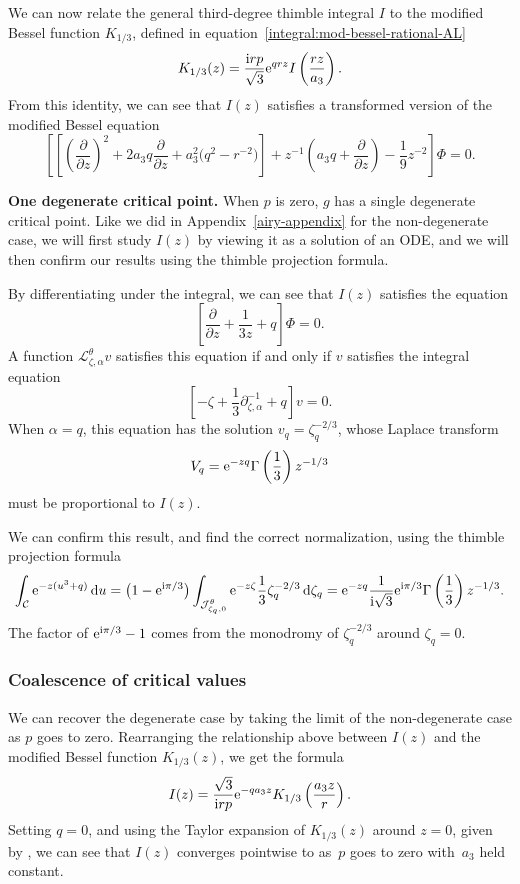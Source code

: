 \documentclass[10pt,a4paper]{amsart}
\newcommand{\laplace}{\mathcal{L}}
\numberwithin{equation}{section}
\begin{document}
We can now relate the general third-degree thimble integral $I$ to the modified Bessel function $K_{1/3}$, defined in equation~\eqref{integral:mod-bessel-rational-AL}
\[
K_{1/3}(z) = \frac{{\rm i}rp}{\sqrt{3}} {\rm e}^{qrz} I\left(\frac{rz}{a_3}\right).
\]
From this identity, we can see that $I(z)$ satisfies a transformed version of the modified Bessel equation
\[ \left[ \left[\left(\frac{\partial}{\partial z}\right)^2 + 2a_3 q \frac{\partial}{\partial z} + a_3^2 \big(q^2 - r^{-2}\big)\right] + z^{-1} \left(a_3 q + \frac{\partial}{\partial z}\right) - \frac{1}{9} z^{-2} \right] \Phi = 0. \]

\textbf{One degenerate critical point.}
When $p$ is zero, $g$ has a single degenerate critical point. Like we did in Appendix~\ref{airy-appendix} for the non-degenerate case, we will first study $I(z)$ by viewing it as a solution of an ODE, and we will then confirm our results using the thimble projection formula.

By differentiating under the integral, we can see that $I(z)$ satisfies the equation
\[%
\left[\frac{\partial}{\partial z} + \frac{1}{3z} +q \right] \Phi = 0.
\]
A function $\laplace_{\zeta,\alpha}^{\theta} v$ satisfies this equation if and only if $v$ satisfies the integral equation
\[ \left[ -\zeta + \frac{1}{3} \partial^{-1}_{\zeta, \alpha} +q \right] v = 0. \]
When $\alpha = q$, this equation has the solution
$ v_q = \zeta_q^{-2/3}$,
whose Laplace transform
\[ V_q = {\rm e}^{-zq} \Gamma\left(\frac{1}{3}\right) z^{-1/3} \]
must be proportional to $I(z)$.

We can confirm this result, and find the correct normalization, using the thimble projection formula
\begin{align*}
\int_{\mathcal{C}} {\rm e}^{-z(u^3+q)} \, {\rm d}u = \bigl(1 - {\rm e}^{{\rm i}\pi/3}\bigr) \int_{\mathcal{J}_{\zeta_q, 0}^\theta} {\rm e}^{-z\zeta} \frac{1}{3}\zeta_q^{-2/3} \, {\rm d}\zeta_q = {\rm e}^{-zq}\frac{1}{{\rm i}\sqrt{3}} {\rm e}^{{\rm i}\pi/3} \Gamma\left(\frac{1}{3}\right) z^{-1/3}.
\end{align*}
The factor of ${\rm e}^{{\rm i}\pi/3} - 1$ comes from the monodromy of $\zeta_q^{-2/3}$ around $\zeta_q = 0$.

\subsubsection{Coalescence of critical values}
We can recover the degenerate case by taking the limit of the non-degenerate case as $p$ goes to zero. Rearranging the relationship above between $I(z)$ and the modified Bessel function $K_{1/3}(z)$, we get the formula
\[ I(z) = \frac{\sqrt{3}}{{\rm i}rp} {\rm e}^{-qa_3z} K_{1/3}\left(\frac{a_3 z}{r}\right). \]
Setting $q=0$, and using the Taylor expansion of $K_{1/3}(z)$ around $z = 0$, given by \cite[equations~(10.25.2) and~(10.27.4)]{dlmf}, we can see that $I(z)$ converges pointwise to  as~$p$ goes to zero with~$a_3$ held constant.
%
\end{document}
